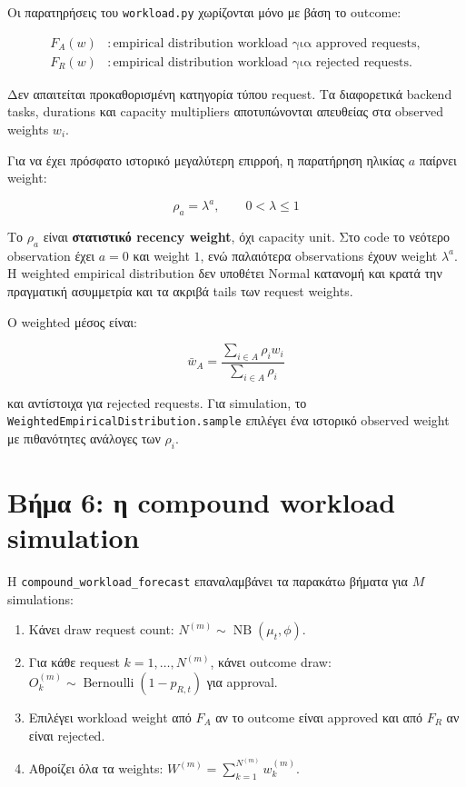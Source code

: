 \documentclass[11pt,a4paper]{article}
\newcommand{\equationnote}[1]{
  \begin{center}
    \colorbox{boxblue}{\parbox{0.92\linewidth}{\begin{equation*}#1\end{equation*}}}
  \end{center}
}
\newcommand{\code}[1]{\texttt{#1}}
\begin{document}
Οι παρατηρήσεις του \code{workload.py} χωρίζονται μόνο με βάση το outcome:

\begin{align*}
  F_A(w) &: \text{empirical distribution workload για approved requests},\\
  F_R(w) &: \text{empirical distribution workload για rejected requests}.
\end{align*}

Δεν απαιτείται προκαθορισμένη κατηγορία τύπου request. Τα διαφορετικά
backend tasks, durations και capacity multipliers αποτυπώνονται απευθείας
στα observed weights $w_i$.

Για να έχει πρόσφατο ιστορικό μεγαλύτερη επιρροή, η παρατήρηση ηλικίας $a$
παίρνει weight:

\equationnote{\rho_a=\lambda^a, \qquad 0<\lambda\leq1}

Το $\rho_a$ είναι \textbf{στατιστικό recency weight}, όχι capacity unit.
Στο code το νεότερο observation έχει $a=0$ και weight $1$, ενώ παλαιότερα
observations έχουν weight $\lambda^a$. Η weighted empirical distribution δεν
υποθέτει Normal κατανομή και κρατά την πραγματική ασυμμετρία και τα ακριβά
tails των request weights.

Ο weighted μέσος είναι:

\equationnote{\bar{w}_A=\frac{\sum_{i\in A}\rho_iw_i}{\sum_{i\in A}\rho_i}}

και αντίστοιχα για rejected requests. Για simulation, το
\code{WeightedEmpiricalDistribution.sample} επιλέγει ένα ιστορικό observed
weight με πιθανότητες ανάλογες των $\rho_i$.

\section{Βήμα 6: η compound workload simulation}

Η \code{compound\_workload\_forecast} επαναλαμβάνει τα παρακάτω βήματα για
$M$ simulations:

\begin{enumerate}
  \item Κάνει draw request count:
        $N^{(m)}\sim\operatorname{NB}(\mu_t,\phi)$.
  \item Για κάθε request $k=1,\ldots,N^{(m)}$, κάνει outcome draw:
        $O_k^{(m)}\sim\operatorname{Bernoulli}(1-p_{R,t})$ για approval.
  \item Επιλέγει workload weight από $F_A$ αν το outcome είναι approved και
        από $F_R$ αν είναι rejected.
  \item Αθροίζει όλα τα weights:
        $W^{(m)}=\sum_{k=1}^{N^{(m)}}w_k^{(m)}$.
\end{enumerate}
\end{document}
